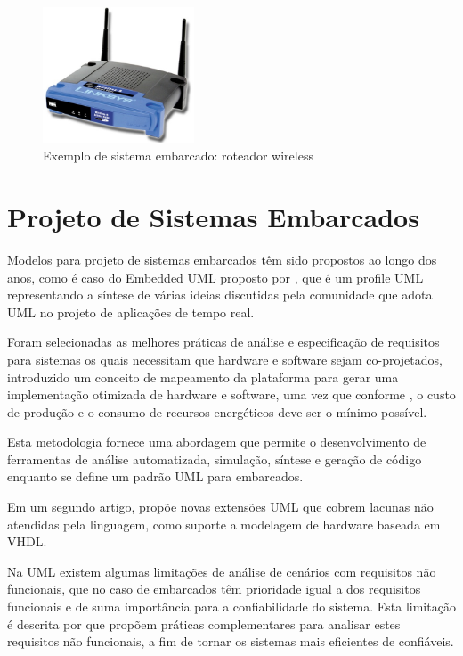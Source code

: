 \begin{figure}[h!]
			\centering
			\includegraphics[width=0.4\textwidth]{figures/embarcado_exemplo.jpg}
			\caption{Exemplo de sistema embarcado: roteador wireless}
			\label{fig:roteador}
	\end{figure}


\hfill

\section{Projeto de Sistemas Embarcados}

Modelos para projeto de sistemas embarcados têm sido propostos ao longo dos anos, como é caso do Embedded UML proposto por \textcite{Martin:2001}, que é um profile UML representando a síntese de várias ideias discutidas pela comunidade que adota UML no projeto de aplicações de tempo real. 

Foram selecionadas as melhores práticas de análise e especificação de requisitos para sistemas os quais necessitam que hardware e software sejam co-projetados, introduzido um conceito de mapeamento da plataforma para gerar uma implementação otimizada de hardware e software, uma vez que conforme \textcite{Wolf:2001}, o custo de produção e o consumo de recursos energéticos deve ser o mínimo possível.

Esta metodologia fornece uma abordagem que permite o desenvolvimento de ferramentas de análise automatizada, simulação, síntese e geração de código enquanto se define um padrão UML para embarcados.

Em um segundo artigo, \textcite{Martin:2002} propõe novas extensões UML que cobrem lacunas não atendidas pela linguagem, como suporte a modelagem de hardware baseada em VHDL.

Na UML existem algumas limitações de análise de cenários com requisitos não funcionais, que no caso de embarcados têm prioridade igual a dos requisitos funcionais e de suma importância para a confiabilidade do sistema. Esta limitação é descrita por \textcite{Espinoza:2008} que propõem práticas complementares para analisar estes requisitos não funcionais, a fim de tornar os sistemas mais eficientes de confiáveis.

